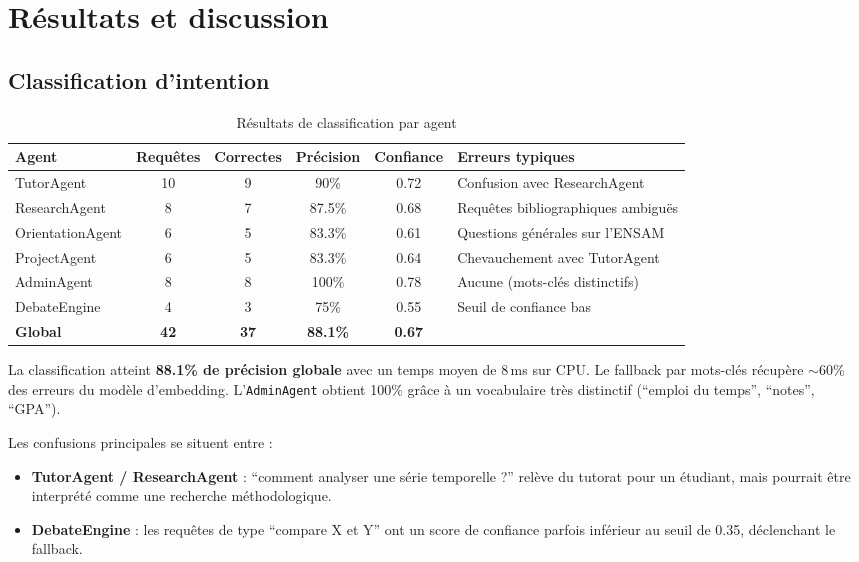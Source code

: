 \documentclass[12pt, a4paper]{article}
\begin{document}
\section{Résultats et discussion}
\label{chap:resultats}

\subsection{Classification d'intention}

\begin{table}[H]
\centering
\caption{Résultats de classification par agent}
\label{tab:classif_results}
\small
\begin{tabularx}{\textwidth}{l c c c c X}
\toprule
\textbf{Agent} & \textbf{Requêtes} & \textbf{Correctes} & \textbf{Précision} & \textbf{Confiance} & \textbf{Erreurs typiques} \\
\midrule
TutorAgent & 10 & 9 & 90\% & 0.72 & Confusion avec ResearchAgent \\
ResearchAgent & 8 & 7 & 87.5\% & 0.68 & Requêtes bibliographiques ambiguës \\
OrientationAgent & 6 & 5 & 83.3\% & 0.61 & Questions générales sur l'ENSAM \\
ProjectAgent & 6 & 5 & 83.3\% & 0.64 & Chevauchement avec TutorAgent \\
AdminAgent & 8 & 8 & 100\% & 0.78 & Aucune (mots-clés distinctifs) \\
DebateEngine & 4 & 3 & 75\% & 0.55 & Seuil de confiance bas \\
\midrule
\rowcolor{ensambg}
\textbf{Global} & \textbf{42} & \textbf{37} & \textbf{88.1\%} & \textbf{0.67} & \\
\bottomrule
\end{tabularx}
\end{table}

La classification atteint \textbf{88.1\% de précision globale} avec un temps moyen de 8\,ms sur CPU. Le fallback par mots-clés récupère $\sim$60\% des erreurs du modèle d'embedding. L'\texttt{AdminAgent} obtient 100\% grâce à un vocabulaire très distinctif (``emploi du temps'', ``notes'', ``GPA'').

Les confusions principales se situent entre :
\begin{itemize}
  \item \textbf{TutorAgent / ResearchAgent} : ``comment analyser une série temporelle ?'' relève du tutorat pour un étudiant, mais pourrait être interprété comme une recherche méthodologique.
  \item \textbf{DebateEngine} : les requêtes de type ``compare X et Y'' ont un score de confiance parfois inférieur au seuil de 0.35, déclenchant le fallback.
\end{itemize}
\end{document}
